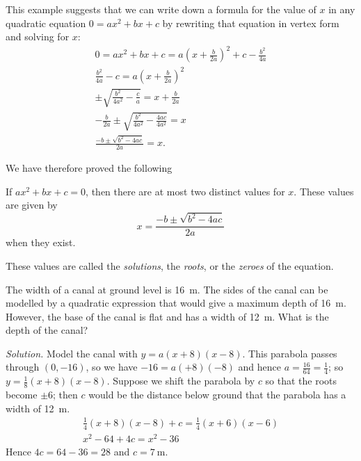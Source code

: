 This example suggests that we can write down a formula for the value of $ x $ in any quadratic equation $ 0 = ax^2 + bx + c $
by rewriting that equation in vertex form and solving for $ x $:
\begin{gather*}
  0 = ax^2 + bx + c = a\left(x + \frac{b}{2a}\right)^2 + c - \frac{b^2}{4a}\\
  \frac{b^2}{4a} - c = a\left(x + \frac{b}{2a}\right)^2\\
  \pm\sqrt{\frac{b^2}{4a^2} - \frac{c}{a}} = x + \frac{b}{2a}\\
  - \frac{b}{2a} \pm\sqrt{\frac{b^2}{4a^2} - \frac{4ac}{4a^2}} = x\\
  \frac{-b \pm \sqrt{b^2 - 4ac}}{2a} = x.
\end{gather*}

We have therefore proved the following
\begin{thm}
  If $ ax^2 + bx + c = 0 $, then there are at most two distinct values for $ x $. These values are given by
  \begin{displaymath}
    x = \frac{-b \pm \sqrt{b^2 - 4ac}}{2a}
  \end{displaymath}
  when they exist.
\end{thm}

These values are called the \emph{solutions}, the \emph{roots}, or the \emph{zeroes} of the equation.

\begin{ex}
  The width of a canal at ground level is \SI{16}{\metre}. The sides of the canal can  be modelled by a quadratic expression
  that would give a maximum depth of \SI{16}{\metre}. However, the base of the canal is flat and has a width of \SI{12}{\metre}.
  What is the depth of the canal?

  \textit{Solution.} Model the canal with $ y = a(x + 8)(x - 8) $. This parabola passes through $ (0, -16) $, so we have $ -16 = a(+8)(-8) $
  and hence $ a = \frac{16}{64} = \frac{1}{4} $; so $ y = \frac{1}{8}(x + 8)(x - 8) $. Suppose we shift the parabola by $ c $ so that the
  roots become $ \pm 6 $; then $ c $ would   be the distance below ground that the parabola has a width of \SI{12}{\metre}.
  \begin{gather*}
    \frac{1}{4}(x + 8)(x - 8) + c = \frac{1}{4}(x + 6)(x - 6)\\
    x^2 - 64 + 4c = x^2 - 36
  \end{gather*}
  Hence $ 4c = 64 - 36 = 28 $ and $ c = \SI{7}{\metre} $.
\end{ex}

